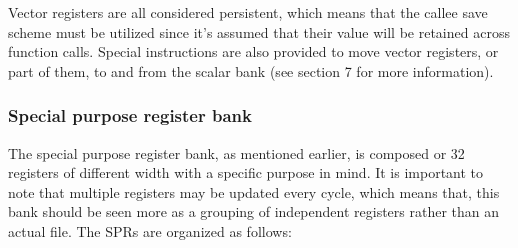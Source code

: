 \documentclass{article}
\begin{document}
                Vector registers are all considered persistent, which means that the callee save scheme must be utilized since it's assumed that their value will be retained across function calls. Special instructions are also provided to move vector registers, or part of them, to and from the scalar bank (see section 7 for more information).

            \subsubsection{Special purpose register bank}

                \vspace{10pt}

                The special purpose register bank, as mentioned earlier, is composed or 32 registers of different width with a specific purpose in mind. It is important to note that multiple registers may be updated every cycle, which means that, this bank should be seen more as a grouping of independent registers rather than an actual file. The SPRs are organized as follows:
\end{document}
